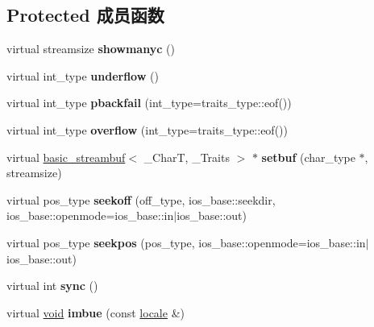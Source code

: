 \subsection*{Protected 成员函数}
\begin{DoxyCompactItemize}
\item 
\mbox{\label{classbasic__filebuf_a9869e2bbe4670f91611b0c327ea9a9cb}} 
virtual streamsize {\bfseries showmanyc} ()
\item 
\mbox{\label{classbasic__filebuf_a077adc8e4c4531708e256d1b9acf4474}} 
virtual int\+\_\+type {\bfseries underflow} ()
\item 
\mbox{\label{classbasic__filebuf_ae86cd9792f4a3908d655fb16dbb905d8}} 
virtual int\+\_\+type {\bfseries pbackfail} (int\+\_\+type=traits\+\_\+type\+::eof())
\item 
\mbox{\label{classbasic__filebuf_a9ac4899dc2cc54f411ad458fca5b39ca}} 
virtual int\+\_\+type {\bfseries overflow} (int\+\_\+type=traits\+\_\+type\+::eof())
\item 
\mbox{\label{classbasic__filebuf_a231779749ea09220b1dc05855f9fdcbe}} 
virtual \hyperlink{classbasic__streambuf}{basic\+\_\+streambuf}$<$ \+\_\+\+CharT, \+\_\+\+Traits $>$ $\ast$ {\bfseries setbuf} (char\+\_\+type $\ast$, streamsize)
\item 
\mbox{\label{classbasic__filebuf_a5f7cf55733215c6639f54a028bbd0352}} 
virtual pos\+\_\+type {\bfseries seekoff} (off\+\_\+type, ios\+\_\+base\+::seekdir, ios\+\_\+base\+::openmode=ios\+\_\+base\+::in$\vert$ios\+\_\+base\+::out)
\item 
\mbox{\label{classbasic__filebuf_aeb3e007db026bc8e4d4f9a6b13f4eaba}} 
virtual pos\+\_\+type {\bfseries seekpos} (pos\+\_\+type, ios\+\_\+base\+::openmode=ios\+\_\+base\+::in$\vert$ios\+\_\+base\+::out)
\item 
\mbox{\label{classbasic__filebuf_a6c40ef06f0a1e3f15a9858b9681106a7}} 
virtual int {\bfseries sync} ()
\item 
\mbox{\label{classbasic__filebuf_afd5bb604632c4b6e6571bee2d3dc9f52}} 
virtual \hyperlink{interfacevoid}{void} {\bfseries imbue} (const \hyperlink{classlocale}{locale} \&)
\end{DoxyCompactItemize}
